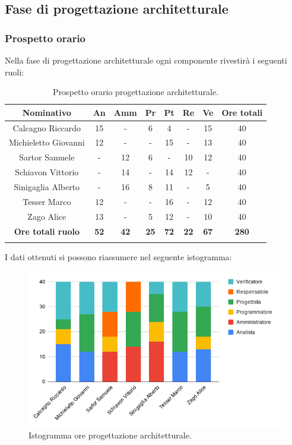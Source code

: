 			

%
%
%
%
\subsection{Fase di progettazione architetturale}

\subsubsection{Prospetto orario}

Nella fase di progettazione architetturale ogni componente rivestirà i seguenti ruoli:
\begin{longtable}{|c|c|c|c|c|c|c|c|}
	\hline
	\rowcolor[HTML]{F9CB9C} 
	\textbf{Nominativo} & \textbf{An} & \textbf{Amm} & \textbf{Pr} & \textbf{Pt} & \textbf{Re} & \textbf{Ve} & \textbf{Ore totali} \\
	\hline
	Calcagno Riccardo &
	15 &
	- &
	6 &
	4 &
	- &
	15 &
	40 \\
	\hline
	Michieletto Giovanni &
	12 &
	- &
	- &
	15 &
	- &
	13 &
	40 \\
	\hline
	Sartor Samuele  &
	- &
	12 &
	6 &
	- &
	10 &
	12 &
	40 \\
	\hline
	Schiavon Vittorio & 
	- &
	14 &
	- &
	14 &
	12 &
	- &
	40 \\
	\hline
	Sinigaglia Alberto & 
	- &
	16 &
	8 &
	11 &
	- &
	5 &
	40 \\
	\hline
	Tesser Marco &
	12 &
	- &
	- &
	16 &
	- &
	12 &
	40 \\
	\hline
	Zago Alice &
	13 &
	- &
	5 &
	12 &
	- &
	10 &
	40 \\
	\hline	
	\rowcolor[HTML]{F9CB9C} 
	\textbf{Ore totali ruolo} & \textbf{52} & \textbf{42} & \textbf{25} & \textbf{72} & \textbf{22} & \textbf{67} & \textbf{280} \\
	\hline
	\caption{Prospetto orario progettazione architetturale.}
	\label{fig: Prospetto orario progettazione architetturaleo.}
\end{longtable}

I dati ottenuti si possono riassumere nel seguente istogramma:
\begin{figure}[H]
	\centering
	\includegraphics[width=0.8\linewidth]{./res/images/OreProgettazioneArchitetturale.png}
	\caption{Istogramma ore progettazione architetturale.}
	\label{fig: Istogramma ore progettazione architetturale.}
\end{figure}

